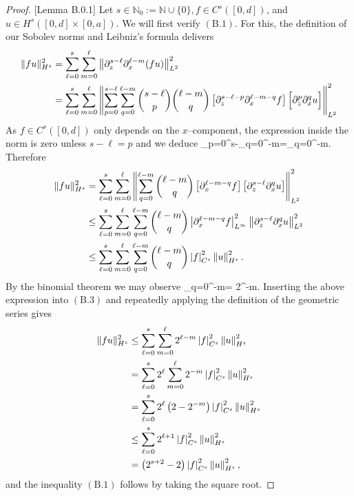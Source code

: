 \begin{proof}{[Lemma B.0.1]} Let $s\in \mathbb N_0:=\mathbb N\cup\{0\}, f\in C^s([0,d])$, and $u\in H^s([0,d]\times [0,a])$. We will first verify $(\text{B}.1)$. For this, the definition of our Sobolev norms and Leibniz's formula delivers
\begin{align*}
\|fu\|_{H^s}^2 &= \sum_{\ell=0}^s \sum_{m=0}^{\ell} \left\lVert\partial_z^{s-\ell}\partial_x^{\ell - m}(fu)\right\rVert_{L^2}^2 \\&=
\sum_{\ell=0}^s \sum_{m=0}^{\ell}\left\lVert \sum_{p=0}^{s-\ell}\sum_{q=0}^{\ell-m}\binom{s - \ell}{p}\binom{\ell - m}{q}\left[\partial_z^{s-\ell-p}\partial_x^{\ell-m-q}f\right]\Big[\partial_z^p\partial_x^{q}u\Big]\right\rVert_{L^2}^2
\end{align*}
As $f\in C^s([0,d])$ only depends on the $x$--component, the expression inside the norm is zero unless $s-\ell= p$ and we deduce
\bes
\sum_{p=0}^{s-\ell}\sum_{q=0}^{\ell-m}=\sum_{q=0}^{\ell-m}.
\ees
Therefore
\begin{align}
\|fu\|_{H^s}^2 &= \sum_{\ell=0}^s \sum_{m=0}^{\ell}\left\lVert\sum_{q=0}^{\ell-m}\binom{\ell - m}{q}\left[\partial_x^{\ell-m-q}f\right]\left[\partial_z^{s-\ell}\partial_x^{q}u\right]\right\rVert_{L^2}^2 \nonumber\\&\leq 
\sum_{\ell=0}^s \sum_{m=0}^{\ell}\sum_{q=0}^{\ell-m}\binom{\ell - m}{q}\left|\partial_x^{\ell-m-q}f\right|_{L^{\infty}}^2 \left\lVert\partial_z^{s-\ell}\partial_x^{q}u\right\rVert_{L^2}^2 \nonumber\\& \leq
\sum_{\ell=0}^s \sum_{m=0}^{\ell}\sum_{q=0}^{\ell-m}\binom{\ell - m}{q} \left|f\right|_{C^s}^2 \left\lVert u\right\rVert_{H^s}^2.
\end{align}
By the binomial theorem we may observe
\bes
\sum_{q=0}^{\ell-m}= 2^{\ell-m}.
\ees
Inserting the above expression into $(\text{B}.3)$ and repeatedly applying the definition of the geometric series gives
\begin{align*}
\|fu\|_{H^s}^2 & \leq 
\sum_{\ell=0}^s \sum_{m=0}^{\ell} 2^{\ell-m}\left|f\right|_{C^s}^2 \left\lVert u\right\rVert_{H^s}^2 \\&=
\sum_{\ell=0}^s 2^{\ell} \sum_{m=0}^{\ell} 2^{-m}\left|f\right|_{C^s}^2 \left\lVert u\right\rVert_{H^s}^2 \\& =
\sum_{\ell=0}^s 2^{\ell}\left(2-2^{-m}\right)\left|f\right|_{C^s}^2 \left\lVert u\right\rVert_{H^s}^2\\&\leq
\sum_{\ell=0}^s 2^{\ell+1}\left|f\right|_{C^s}^2 \left\lVert u\right\rVert_{H^s}^2 \\&=
\left(2^{s+2}-2\right)\left|f\right|_{C^s}^2 \left\lVert u\right\rVert_{H^s}^2,
\end{align*}
and the inequality $(\text{B}.1)$ follows by taking the square root.


\end{proof}
